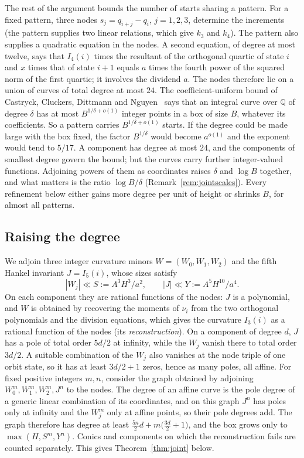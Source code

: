 \documentclass[11pt]{article}
\theoremstyle{definition}
\theoremstyle{remark}
\begin{document}
The rest of the argument bounds the number of starts sharing a pattern. For
a fixed pattern, three nodes $s_j=q_{i+j}-q_i$, $j=1,2,3$, determine the
increments (the pattern supplies two linear relations, which give $k_3$ and
$k_4$). The pattern also supplies a quadratic equation in the nodes. A second
equation, of degree at most twelve, says that $I_4(i)$ times the resultant of
the orthogonal quartic of state $i$ and $x$ times that of state $i+1$ equals
$a$ times the fourth power of the squared norm of the first quartic; it
involves the dividend $a$. The nodes therefore lie on a union of curves of total degree at most $24$. The
coefficient-uniform bound of Castryck, Cluckers, Dittmann and
Nguyen~\cite{CCDN} says that an integral curve over $\mathbb Q$ of degree
$\delta$ has at most $B^{1/\delta+o(1)}$ integer points in a box of size
$B$, whatever its coefficients. So a pattern carries $B^{1/\delta+o(1)}$
starts. If the degree could be made large with the box fixed, the factor
$B^{1/\delta}$ would become $a^{o(1)}$ and the exponent would tend to $5/17$.
A component has degree at most $24$, and the components of smallest degree
govern the bound; but the curves carry further integer-valued functions.
Adjoining powers of them as coordinates raises $\delta$ and $\log B$ together,
and what matters is the ratio $\log B/\delta$ (Remark~\ref{rem:jointscales}). Every refinement below either gains more degree per
unit of height or shrinks $B$, for almost all patterns.

\subsection*{Raising the degree}
We adjoin three integer curvature minors $W=(W_0,W_1,W_2)$ and the fifth
Hankel invariant $J=I_5(i)$, whose sizes satisfy
\[
 |W_j|\ll S:=A^3H^3/a^2,\qquad |J|\ll Y:=A^5H^{10}/a^4.
\]
On each component they are rational functions of the nodes: $J$ is a
polynomial, and $W$ is obtained by recovering the moments of $\nu_i$ from the
two orthogonal polynomials and the division equations, which gives the
curvature $I_3(i)$ as a rational function of the nodes (its
\emph{reconstruction}).
On a component of degree $d$, $J$ has a pole of total order $5d/2$ at
infinity, while the $W_j$ vanish there to total order $3d/2$. A suitable
combination of the $W_j$ also vanishes at the node triple of one orbit
state, so it has at least $3d/2+1$ zeros, hence as many poles, all affine.
For fixed positive integers $m,n$, consider the graph obtained by adjoining
$W_0^m,W_1^m,W_2^m,J^n$ to the nodes. The degree of an affine curve is the
pole degree of a generic linear combination of its coordinates, and on this
graph $J^n$ has poles only at infinity and the $W_j^m$ only at affine
points, so their pole degrees add. The graph therefore has
degree at least $\frac{5n}2d+m\bigl(\frac{3d}2+1\bigr)$, and the box grows
only to $\max(H,S^m,Y^n)$. Conics and components on which the reconstruction
fails are counted separately. This gives Theorem~\ref{thm:joint} below.
\end{document}
